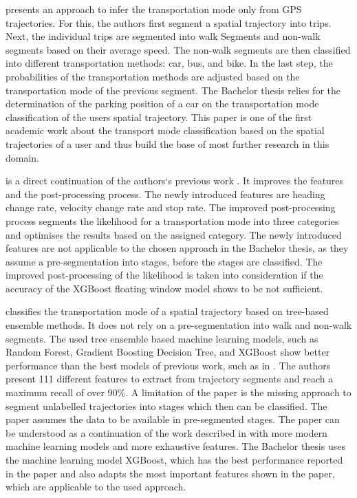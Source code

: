 \cite{Zheng2008} presents an approach to infer the transportation mode only from GPS trajectories. For this, the authors first segment a spatial trajectory into trips. Next, the individual trips are segmented into walk Segments and non-walk segments based on their average speed. The non-walk segments are then classified into different transportation methods: car, bus, and bike. In the last step, the probabilities of the transportation methods are adjusted based on the transportation mode of the previous segment. \newline
The Bachelor thesis relies for the determination of the parking position of a car on the transportation mode classification of the users spatial trajectory. This paper is one of the first academic work about the transport mode classification based on the spatial trajectories of a user and thus build the base of most further research in this domain.

\cite{zheng2008understanding} is a direct continuation of the authors`s previous work \cite{Zheng2008}. It improves the features and the post-processing process. The newly introduced features are heading change rate, velocity change rate and stop rate. The improved post-processing process segments the likelihood for a transportation mode into three categories and optimises the results based on the assigned category. \newline
The newly introduced features are not applicable to the chosen approach in the Bachelor thesis, as they assume a pre-segmentation into stages, before the stages are classified. The improved post-processing of the likelihood is taken into consideration if the accuracy of the XGBoost floating window model shows to be not sufficient. 

\cite{Xiao2017} classifies the transportation mode of a spatial trajectory based on tree-based ensemble methods. It does not rely on a pre-segmentation into walk and non-walk segments. The used tree ensemble based machine learning models, such as Random Forest, Gradient Boosting Decision Tree, and XGBoost show better performance than the best models of previous work, such as in \cite{Zheng2008}. The authors present 111 different features to extract from trajectory segments and reach a maximum recall of over 90\%. A limitation of the paper is the missing approach to segment unlabelled trajectories into stages which then can be classified. The paper assumes the data to be available in pre-segmented stages.\newline
The paper can be understood as a continuation of the work described in \cite{Zheng2008} with more modern machine learning models and more exhaustive features. The Bachelor thesis uses the machine learning model XGBoost, which has the best performance reported in the paper and also adapts the most important features shown in the paper, which are applicable to the used approach. \cite{chen2016xgboost}

